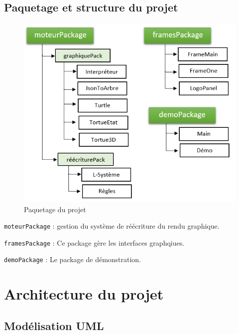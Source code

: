     \subsection{Paquetage et structure du projet}
    \begin{figure}[h]
      \begin{center}
         \includegraphics[width=12cm]{images/paquetage.png}
      \end{center}
        \caption{Paquetage du projet }
        \label{fig:paquetage}
    \end{figure}
    \vspace{1cm}
    \begin{onehalfspace}
    \Large{\texttt{moteurPackage} : gestion du système de réécriture du rendu graphique.}
    
     \Large{\texttt{framesPackage} : Ce package gère les interfaces graphqiues.}
     
    \Large{\texttt{demoPackage} : Le package de démonstration. }
    \end{onehalfspace}
    
    
    \newpage

     \newpage
    
\section{Architecture du projet}
    \subsection{Modélisation UML}
    
